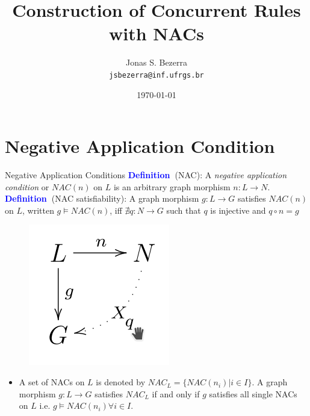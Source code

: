 \documentclass[xcolor=dvipsnames,pdf,10pt]{beamer}
\title     [Construction of Concurrent Rules with NACs]      {Construction of Concurrent Rules with NACs}
\author    [Author]                    {Jonas S. Bezerra\\ \texttt{jsbezerra@inf.ufrgs.br}}
\institute                             {\inftitle}
\date                                  {\today}
\newcommand{\defn}{\textcolor{blue}{\textbf{\textrm{Definition\ }}}}
\begin{document}
\titlepageINF

\tableofcontentsINF

\section{Negative Application Condition}

\begin{frame}[allowframebreaks]{Negative Application Conditions}
\defn (NAC): A \emph{negative application condition} or $NAC(n)$ on $L$ is an arbitrary graph morphism $n : L \rightarrow N$.\\


\defn (NAC satisfiability): A graph morphism $g: L \rightarrow G$ satisfies $NAC(n)$ on $L$, written $g \models NAC(n)$, iff $\nexists q : N \rightarrow G$ such that $q$ is injective and $q \circ n = g$

\begin{figure}[htbp]
\centering
\includegraphics[width=.4\textwidth]{fig/nac-satis.png}
\label{fig:nac-satis}
\end{figure}

\begin{itemize}
\item A set of NACs on $L$ is denoted by $NAC_L = \{NAC(n_i) | i \in I\}$.  A graph morphism $g : L \rightarrow G$ satisfies $NAC_L$ if and only if $g$ satisfies all single NACs on $L$ i.e. $g \models NAC(n_i) \forall i \in I$.
\end{itemize}


\end{frame}
\end{document}
